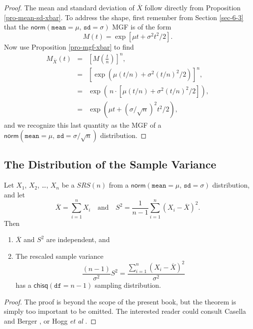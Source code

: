 \begin{proof}
The mean and standard deviation of \(\overline{X}\) follow directly
from Proposition \ref{pro-mean-sd-xbar}. To address the shape, first
remember from Section \ref{sec-6-3} that the
\(\mathsf{norm}(\mathtt{mean}=\mu,\,\mathtt{sd}=\sigma)\) MGF is of
the form \[ M(t)=\exp\left[ \mu t+\sigma^{2}t^{2}/2\right] .  \] Now
use Proposition \ref{pro-mgf-xbar} to find
\begin{eqnarray*}
M_{\overline{X}}(t) & = & \left[M\left(\frac{t}{n}\right)\right]^{n},\\
 & = & \left[\exp\left( \mu(t/n)+\sigma^{2}(t/n)^{2}/2\right) \right]^{n},\\
 & = & \exp\left( \, n\cdot\left[\mu(t/n)+\sigma^{2}(t/n)^{2}/2\right]\right) ,\\
 & = & \exp\left( \mu t+(\sigma/\sqrt{n})^{2}t^{2}/2\right),
\end{eqnarray*}
and we recognize this last quantity as the MGF of a
\(\mathsf{norm}(\mathtt{mean}=\mu,\,\mathtt{sd}=\sigma/\sqrt{n})\)
distribution.
\end{proof}

\subsection{The Distribution of the Sample Variance}
\label{sec-8-2-2}

\begin{thm}
\label{thm-Xbar-andS} Let \(X_{1}\), \(X_{2}\), \ldots{}, \(X_{n}\) be a
\(SRS(n)\) from a
\(\mathsf{norm}(\mathtt{mean}=\mu,\,\mathtt{sd}=\sigma)\)
distribution, and let
\begin{equation}
\overline{X}=\sum_{i=1}^{n}X_{i}\quad \mbox{and}\quad S^{2}=\frac{1}{n-1}\sum_{i=1}^{n}(X_{i}-\overline{X})^{2}.
\end{equation}
Then
\begin{enumerate}
\item \(\overline{X}\) and \(S^{2}\) are independent, and
\item The rescaled sample variance
\begin{equation}
\frac{(n-1)}{\sigma^{2}}S^{2}=\frac{\sum_{i=1}^{n}(X_{i}-\overline{X})^{2}}{\sigma^{2}}
\end{equation}
has a \(\mathsf{chisq}(\mathtt{df}=n-1)\) sampling distribution.
\end{enumerate}
\end{thm}

\begin{proof}
The proof is beyond the scope of the present book, but the theorem is
simply too important to be omitted. The interested reader could
consult Casella and Berger \cite{Casella2002}, or Hogg \emph{et al}
\cite{Hogg2005}.
\end{proof}


